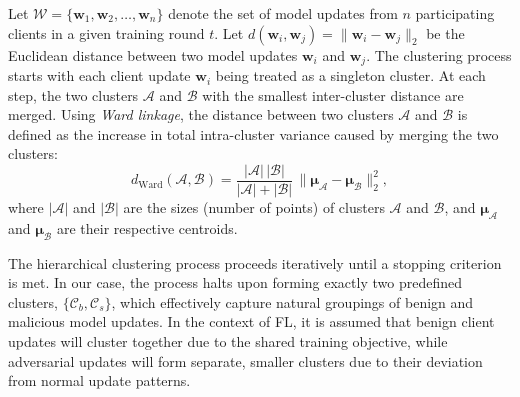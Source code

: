 Let \(\mathcal{W} = \{\mathbf{w}_1, \mathbf{w}_2, \dots, \mathbf{w}_n\}\) denote the set of model updates from \(n\) participating clients in a given training round \(t\). Let $d(\mathbf{w}_i, \mathbf{w}_j) = \| \mathbf{w}_i - \mathbf{w}_j \|_2$ be the Euclidean distance between two model updates \(\mathbf{w}_i\) and \(\mathbf{w}_j\).
%
The clustering process starts with each client update \(\mathbf{w}_i\) being treated as a singleton cluster. At each step, the two clusters \(\mathcal{A}\) and \(\mathcal{B}\) with the smallest inter-cluster distance are merged. Using \textit{Ward linkage}, the distance between two clusters \(\mathcal{A}\) and \(\mathcal{B}\) is defined as the increase in total intra-cluster variance caused by merging the two clusters:
\begin{equation}
    d_{\text{Ward}}(\mathcal{A}, \mathcal{B}) = \frac{|\mathcal{A}| \, |\mathcal{B}|}{|\mathcal{A}| + |\mathcal{B}|} \, \| \boldsymbol{\mu}_{\mathcal{A}} - \boldsymbol{\mu}_{\mathcal{B}} \|_2^2,
\end{equation}
where \(|\mathcal{A}|\) and \(|\mathcal{B}|\) are the sizes (number of points) of clusters \(\mathcal{A}\) and \(\mathcal{B}\), and \(\boldsymbol{\mu}_{\mathcal{A}}\) and \(\boldsymbol{\mu}_{\mathcal{B}}\) are their respective centroids.

The hierarchical clustering process proceeds iteratively until a stopping criterion is met. In our case, the process halts upon forming exactly two predefined clusters, \(\{\mathcal{C}_b, \mathcal{C}_s\}\), which effectively capture natural groupings of benign and malicious model updates.
In the context of FL, it is assumed that benign client updates will cluster together due to the shared training objective, while adversarial updates will form separate, smaller clusters due to their deviation from normal update patterns.

